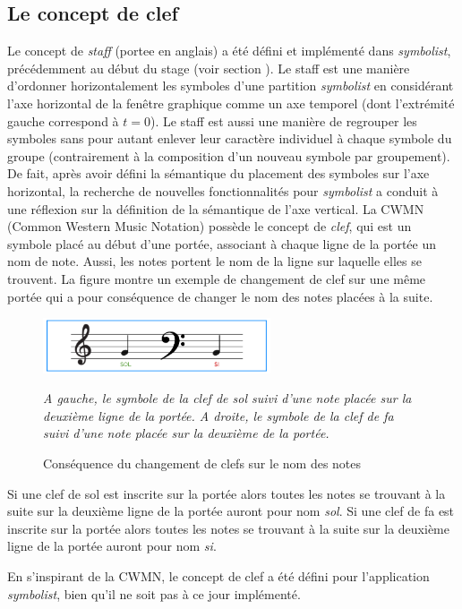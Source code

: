 \subsection{Le concept de clef}
\label{subsec:conceptDeClef}

Le concept de \textit{staff} (\gls{portee} en anglais) a été défini et implémenté dans \textit{symbolist}, précédemment au début du stage (voir section ).
Le staff est une manière d'ordonner horizontalement les symboles d'une partition \textit{symbolist} en considérant l'axe horizontal de la fenêtre graphique comme un axe temporel (dont l'extrémité gauche correspond à $t = 0$). Le staff est aussi une manière de regrouper les symboles sans pour autant enlever leur caractère individuel à chaque symbole du groupe (contrairement à la composition d'un nouveau symbole par groupement).
De fait, après avoir défini la sémantique du placement des symboles sur l'axe horizontal, la recherche de nouvelles fonctionnalités pour \textit{symbolist} a conduit à une réflexion sur la définition de la sémantique de l'axe vertical.
La CWMN (Common Western Music Notation) possède le concept de \textit{clef}, qui est un symbole placé au début d'une portée, associant à chaque ligne de la portée un nom de note.
Aussi, les notes portent le nom de la ligne sur laquelle elles se trouvent.
La figure montre un exemple de changement de clef sur une même portée qui a pour conséquence de changer le nom des notes placées à la suite.
\begin{figure}[H]
	\centering
	\includegraphics[keepaspectratio=true, width=0.6\textwidth]{StructurationRecherche/i/clefsCWMN.png}
	\caption{Conséquence du changement de clefs sur le nom des notes}
	\label{fig:clefsCWMN}
	\small
	\textit{A gauche, le symbole de la clef de sol suivi d'une note placée sur la deuxième ligne de la portée. A droite, le symbole de la clef de fa suivi d'une note placée sur la deuxième de la portée.}
\end{figure}
Si une clef de sol est inscrite sur la portée alors toutes les notes se trouvant à la suite sur la deuxième ligne de la portée auront pour nom \textit{sol}. Si une clef de fa est inscrite sur la portée alors toutes les notes se trouvant à la suite sur la deuxième ligne de la portée auront pour nom \textit{si}.

En s'inspirant de la CWMN, le concept de clef a été défini pour l'application \textit{symbolist}, bien qu'il ne soit pas à ce jour implémenté. 